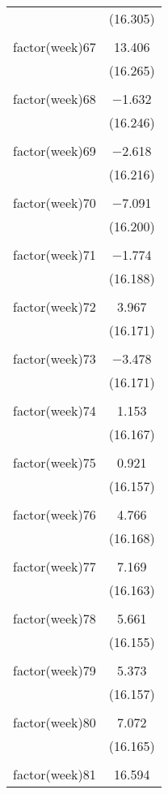 \documentclass[twoside,twocolumn]{article}
\begin{document}
\begin{table}[!htbp]
\begin{tabular}{@{\extracolsep{5pt}}lc}
  & (16.305) \\ 
  & \\ 
 factor(week)67 & 13.406 \\ 
  & (16.265) \\ 
  & \\ 
 factor(week)68 & $-$1.632 \\ 
  & (16.246) \\ 
  & \\ 
 factor(week)69 & $-$2.618 \\ 
  & (16.216) \\ 
  & \\ 
 factor(week)70 & $-$7.091 \\ 
  & (16.200) \\ 
  & \\ 
 factor(week)71 & $-$1.774 \\ 
  & (16.188) \\ 
  & \\ 
 factor(week)72 & 3.967 \\ 
  & (16.171) \\ 
  & \\ 
 factor(week)73 & $-$3.478 \\ 
  & (16.171) \\ 
  & \\ 
 factor(week)74 & 1.153 \\ 
  & (16.167) \\ 
  & \\ 
 factor(week)75 & 0.921 \\ 
  & (16.157) \\ 
  & \\ 
 factor(week)76 & 4.766 \\ 
  & (16.168) \\ 
  & \\ 
 factor(week)77 & 7.169 \\ 
  & (16.163) \\ 
  & \\ 
 factor(week)78 & 5.661 \\ 
  & (16.155) \\ 
  & \\ 
 factor(week)79 & 5.373 \\ 
  & (16.157) \\ 
  & \\ 
 factor(week)80 & 7.072 \\ 
  & (16.165) \\ 
  & \\ 
 factor(week)81 & 16.594 \\ 

\end{tabular}
\end{table}
\end{document}
